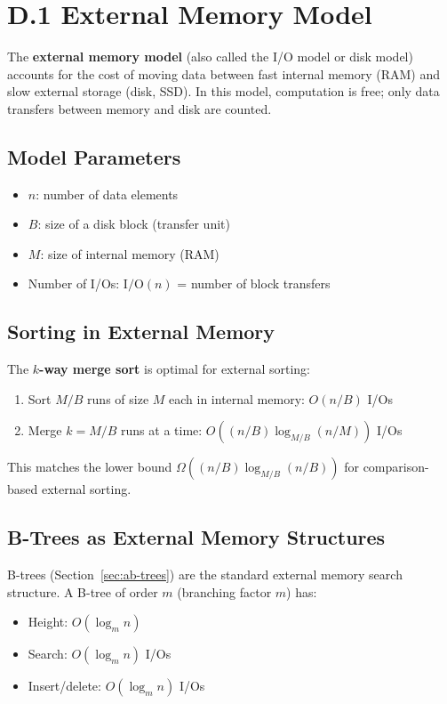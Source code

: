 \section{D.1 External Memory Model}
\label{sec:external-memory}

The \textbf{external memory model} (also called the I/O model or disk model) accounts for the cost of moving data between fast internal memory (RAM) and slow external storage (disk, SSD). In this model, computation is free; only data transfers between memory and disk are counted.

\subsection{Model Parameters}

\begin{itemize}
    \item $n$: number of data elements
    \item $B$: size of a disk block (transfer unit)
    \item $M$: size of internal memory (RAM)
    \item Number of I/Os: $\text{I/O}(n)$ = number of block transfers
\end{itemize}

\subsection{Sorting in External Memory}

The \textbf{$k$-way merge sort} is optimal for external sorting:
\begin{enumerate}
    \item Sort $M/B$ runs of size $M$ each in internal memory: $O(n/B)$ I/Os
    \item Merge $k = M/B$ runs at a time: $O((n/B) \log_{M/B} (n/M))$ I/Os
\end{enumerate}

This matches the lower bound $\Omega((n/B) \log_{M/B} (n/B))$ for comparison-based external sorting.

\subsection{B-Trees as External Memory Structures}

B-trees (Section~\ref{sec:ab-trees}) are the standard external memory search structure. A B-tree of order $m$ (branching factor $m$) has:
\begin{itemize}
    \item Height: $O(\log_m n)$
    \item Search: $O(\log_m n)$ I/Os
    \item Insert/delete: $O(\log_m n)$ I/Os
\end{itemize}

